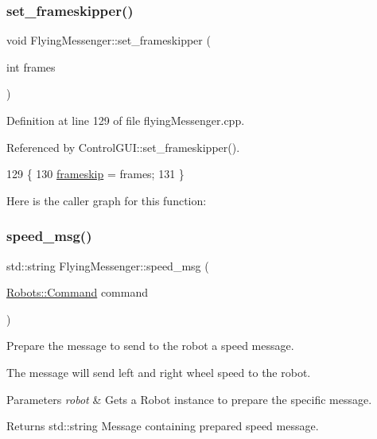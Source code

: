 \subsubsection{\texorpdfstring{set\+\_\+frameskipper()}{set\_frameskipper()}}
{\footnotesize\ttfamily void Flying\+Messenger\+::set\+\_\+frameskipper (\begin{DoxyParamCaption}\item[{int}]{frames }\end{DoxyParamCaption})}



Definition at line 129 of file flying\+Messenger.\+cpp.



Referenced by Control\+G\+U\+I\+::set\+\_\+frameskipper().


\begin{DoxyCode}
129                                                  \{ 
130     \hyperlink{class_flying_messenger_af2bf887194a8483cbadb5e27d2ec6b58}{frameskip} = frames;
131 \}
\end{DoxyCode}
Here is the caller graph for this function\+:
\mbox{\label{class_flying_messenger_a9d374308f6134d5a5ed5cf3275745301}} 
\subsubsection{\texorpdfstring{speed\+\_\+msg()}{speed\_msg()}}
{\footnotesize\ttfamily std\+::string Flying\+Messenger\+::speed\+\_\+msg (\begin{DoxyParamCaption}\item[{\hyperlink{struct_robots_1_1_command}{Robots\+::\+Command}}]{command }\end{DoxyParamCaption})\hspace{0.3cm}{\ttfamily [private]}}



Prepare the message to send to the robot a speed message. 

The message will send left and right wheel speed to the robot.


\begin{DoxyParams}{Parameters}
{\em robot} & Gets a Robot instance to prepare the specific message. \\
\hline
\end{DoxyParams}
\begin{DoxyReturn}{Returns}
std\+::string Message containing prepared speed message. 
\end{DoxyReturn}


